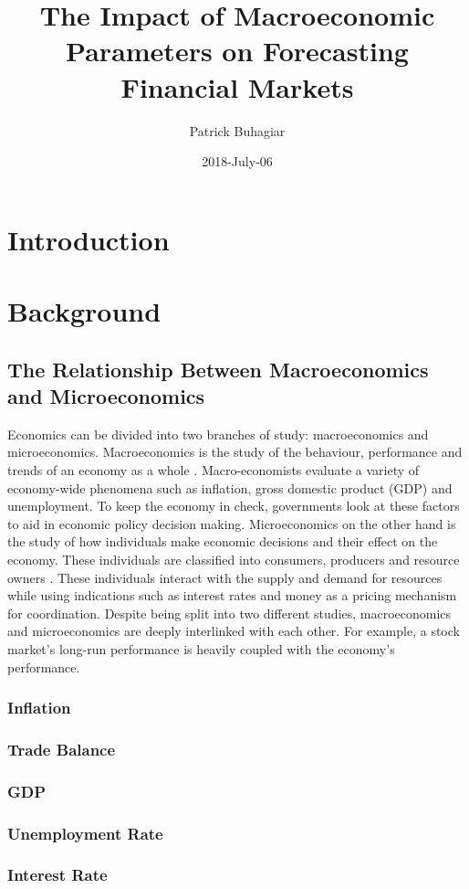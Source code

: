 \documentclass{UoYCSproject}
\author{Patrick Buhagiar}
\title{The Impact of Macroeconomic Parameters on Forecasting Financial Markets}
\date{2018-July-06}
\begin{document}
\maketitle

\listoffigures
\listoftables

\label{sec:start}
\thispagestyle{empty}\cleardoublepage

\chapter{Introduction}
\label{cha:introduction}



\chapter{Background}
\label{cha:background}

\section{The Relationship Between Macroeconomics and Microeconomics}
Economics can be divided into two branches of study: macroeconomics and microeconomics. Macroeconomics is the study of the behaviour, performance and trends of an economy as a whole \cite{2003economics}. Macro-economists evaluate a variety of economy-wide phenomena such as inflation, gross domestic product (GDP) and unemployment. To keep the economy in check, governments look at these factors to aid in economic policy decision making. Microeconomics on the other hand is the study of how individuals make economic decisions and their effect on the economy. These individuals are classified into consumers, producers and resource owners \cite{dwivedi2002microeconomics}. These individuals interact with the supply and demand for resources while using indications such as interest rates and money as a pricing mechanism for coordination.  Despite being split into two different studies, macroeconomics and microeconomics are deeply interlinked with each other. For example, a stock market's long-run performance is heavily coupled with the economy's performance. \ 
\subsection{Inflation}
\subsection{Trade Balance}
\subsection{GDP}
\subsection{Unemployment Rate}
\subsection{Interest Rate}

\medskip
 
\printbibliography
\end{document}
